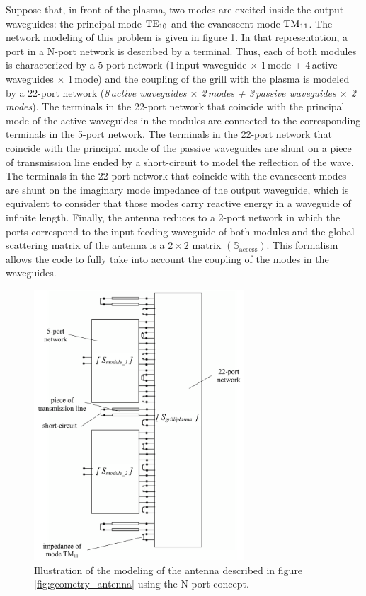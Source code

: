 Suppose that, in front of the plasma, two modes are excited inside the output waveguides: the principal mode ${\mathrm{TE}}_{10}$ and the evanescent mode ${\mathrm{TM}}_{11}$. The network modeling of this problem is given in figure \ref{fig:network_representation}. In that representation, a port in a N-port network is described by a terminal. Thus, each of both modules is characterized by a 5-port network (1\,input waveguide $\times$ 1\,mode + 4\,active waveguides $\times$ 1\,mode) and the coupling of the grill with the plasma is modeled by a 22-port network (\textit{\emph{8\,active waveguides $\times$ 2\,modes + 		3\,passive waveguides $\times$ 2\,modes}}). The terminals in the 22-port network that coincide with the principal mode of the active waveguides in the modules are connected to the corresponding terminals in the 5-port network. The terminals in the 22-port network that coincide with the principal mode of the passive waveguides are shunt on a piece of transmission line ended by a short-circuit to model the reflection of the wave. The terminals in the 22-port network that coincide with the evanescent modes are shunt on the imaginary mode impedance of the output waveguide, which is equivalent to consider that those modes carry reactive energy in a waveguide of infinite length. Finally, the antenna reduces to a 2-port network in which the ports correspond to the input feeding waveguide of both modules and the global scattering matrix of the antenna is a $2\times2$ matrix $\left(\mathbb{S}_{\mbox{access}}\right)$. This formalism allows the code to fully take into account the coupling of the modes in the waveguides.

%
\begin{figure}[h]
	\centering{}\includegraphics[width=0.7\textwidth]{figures/chap2/ALOHA/figure2} \caption{Illustration of the modeling of the antenna described in figure \ref{fig:geometry_antenna}
		using the N-port concept.\label{fig:network_representation} }
	
\end{figure}



